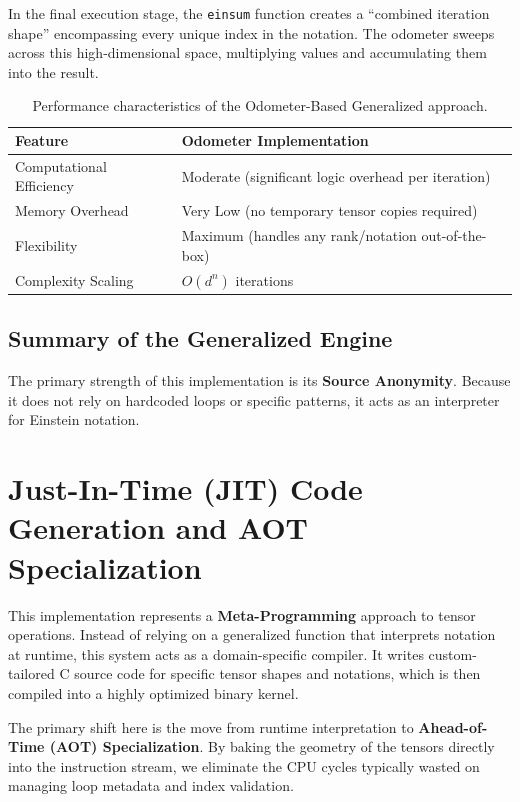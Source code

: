 \documentclass[binding=0.6cm]{sapthesis}
\begin{document}
In the final execution stage, the \texttt{einsum} function creates a ``combined iteration shape'' encompassing every unique index in the notation. The odometer sweeps across this high-dimensional space, multiplying values and accumulating them into the result.

\begin{table}[h]
	\centering
	\begin{tabular}{|l|l|}
		\hline
		\textbf{Feature}         & \textbf{Odometer Implementation}                    \\ \hline
		Computational Efficiency & Moderate (significant logic overhead per iteration) \\ \hline
		Memory Overhead          & Very Low (no temporary tensor copies required)      \\ \hline
		Flexibility              & Maximum (handles any rank/notation out-of-the-box)  \\ \hline
		Complexity Scaling       & $O(d^n)$ iterations                                 \\ \hline
	\end{tabular}
	\caption{Performance characteristics of the Odometer-Based Generalized approach.}
\end{table}

\subsection{Summary of the Generalized Engine}

The primary strength of this implementation is its \textbf{Source Anonymity}. Because it does not rely on hardcoded loops or specific patterns, it acts as an interpreter for Einstein notation.

\section{Just-In-Time (JIT) Code Generation and AOT Specialization}

This implementation represents a \textbf{Meta-Programming} approach to tensor operations. Instead of relying on a generalized function that interprets notation at runtime, this system acts as a domain-specific compiler. It writes custom-tailored C source code for specific tensor shapes and notations, which is then compiled into a highly optimized binary kernel.

The primary shift here is the move from runtime interpretation to \textbf{Ahead-of-Time (AOT) Specialization}.
By baking the geometry of the tensors directly into the instruction stream, we eliminate the CPU cycles typically wasted on managing loop metadata and index validation.
\end{document}
